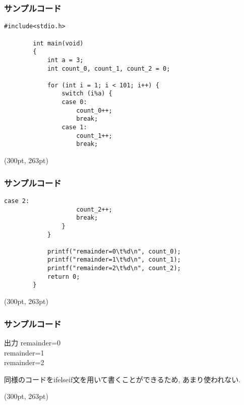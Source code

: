 \documentclass[dvipdfmx]{beamer}
\begin{document}
\begin{frame}[t, fragile]
    \frametitle{サンプルコード}
    \begin{lstlisting}[gobble=8, caption=pra\_switch.c, label=pra-switch1]
        #include<stdio.h>

        int main(void)
        {
            int a = 3;
            int count_0, count_1, count_2 = 0;
            
            for (int i = 1; i < 101; i++) {
                switch (i%a) {
                case 0:
                    count_0++;
                    break;  
                case 1:
                    count_1++;
                    break;
    \end{lstlisting}
    \begin{textblock*}{0.3\linewidth}(300pt, 263pt)
    \space
    \end{textblock*}
\end{frame}

\begin{frame}[t, fragile]
    \frametitle{サンプルコード}
    \begin{lstlisting}[firstnumber=16, gobble=8, caption=pra\_switch.c, label=pra-switch2]
                case 2:
                    count_2++;
                    break;
                }
            }

            printf("remainder=0\t%d\n", count_0);
            printf("remainder=1\t%d\n", count_1);
            printf("remainder=2\t%d\n", count_2);
            return 0;
        }
    \end{lstlisting}
    \begin{textblock*}{0.3\linewidth}(300pt, 263pt)
    \space
    \end{textblock*}
\end{frame}

\begin{frame}[label=41]
    \frametitle{サンプルコード}
    \begin{block}{出力} 
        remainder=0\\
        remainder=1\\
        remainder=2
    \end{block}
    同様のコードをif\space else\space if文を用いて書くことができるため,
    あまり使われない.
    \begin{textblock*}{0.3\linewidth}(300pt, 263pt)
    \space
    \end{textblock*}
\end{frame}
\end{document}
